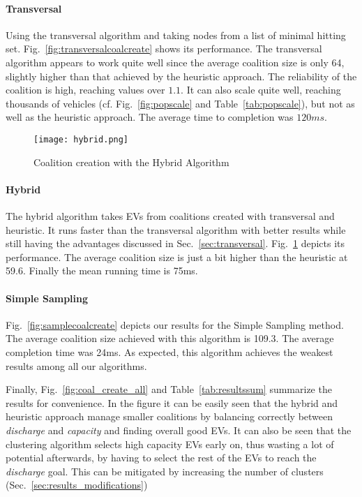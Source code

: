 \paragraph{Transversal}	
Using the transversal algorithm and taking nodes from a list of minimal hitting set. Fig.~\ref{fig:transversalcoalcreate} shows its performance. The transversal algorithm appears to work quite well since the average coalition size is only 64, slightly higher than that achieved by the heuristic approach. The reliability of the coalition is high, reaching  values over $1.1$. It can also scale quite well, reaching thousands of vehicles (cf. Fig.~\ref{fig:popscale} and Table~\ref{tab:popscale}), but not as well as the heuristic approach. The average time to completion was $120ms$. %
\begin{figure}		
	\centering
	\texttt{[image: hybrid.png]}
	\caption{Coalition creation with the\newline
		Hybrid Algorithm \label{fig:hybridcoalcreate}}
\end{figure}
\paragraph{Hybrid}	
The hybrid algorithm takes EVs from coalitions created with transversal and heuristic. It runs faster than the transversal algorithm with better results while still having the advantages discussed in Sec.~\ref{sec:transversal}. Fig.~\ref{fig:hybridcoalcreate} depicts its performance. The average coalition size is just a bit higher than the heuristic at 59.6. Finally the mean running time is 75ms.



\paragraph{Simple Sampling}
Fig.~\ref{fig:samplecoalcreate} depicts our results for the Simple Sampling method. The average coalition size achieved with this algorithm is 109.3. The average completion time was 24ms. As expected, this algorithm achieves the weakest results among all our algorithms.

Finally, Fig.~\ref{fig:coal_create_all} and Table~\ref{tab:resultssum} summarize the results for convenience. In the figure it can be easily seen that the hybrid and heuristic approach manage smaller coalitions by balancing correctly between {\em discharge} and {\em capacity} and finding overall good EVs. It can also be seen that the clustering algorithm selects high capacity EVs early on, thus wasting a lot of potential afterwards, by having to select the rest of the EVs to reach the {\em discharge} goal. This can be mitigated by increasing the number of clusters (Sec.~\ref{sec:results_modifications})

